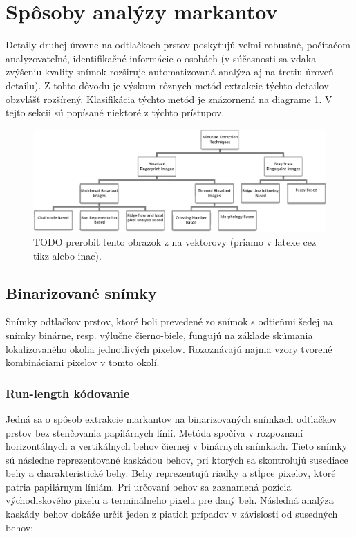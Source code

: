   \section{Spôsoby analýzy markantov} \label{sec:analyza_markantov}
  Detaily druhej úrovne na odtlačkoch prstov poskytujú veľmi robustné, počítačom analyzovateľné, identifikačné informácie o osobách (v súčasnosti sa vďaka
  zvýšeniu kvality snímok rozširuje automatizovaná analýza aj na tretiu úroveň detailu). Z tohto dôvodu je výskum rôznych metód extrakcie týchto detailov
  obzvlášť rozšírený. Klasifikácia týchto metód je znázornená na diagrame \ref{obr:diagram_extrakcia_markantov}. V tejto sekcii sú popísané niektoré
  z týchto prístupov.

  \begin{figure}[h]
    \centering
    \includegraphics[width=\linewidth]{obrazky-figures/klasifikacia_extrakcie_markantov.png}
    \caption{TODO prerobit tento obrazok z \cite{bansal2011minutiae} na vektorovy (priamo v latexe cez tikz alebo inac).}
    \label{obr:diagram_extrakcia_markantov}
  \end{figure}

  \subsection{Binarizované snímky}
  Snímky odtlačkov prstov, ktoré boli prevedené zo snímok s odtieňmi šedej na snímky binárne, resp. výlučne čierno-biele, fungujú na základe skúmania
  lokalizovaného okolia jednotlivých pixelov. Rozoznávajú najmä vzory tvorené kombináciami pixelov v tomto okolí.

  \subsubsection{Run-length kódovanie}
  Jedná sa o spôsob extrakcie markantov na binarizovaných snímkach odtlačkov prstov bez stenčovania papilárnych línií.
  Metóda spočíva v rozpoznaní horizontálnych a vertikálnych behov čiernej v binárnych snímkach. Tieto snímky sú následne reprezentované kaskádou behov,
  pri ktorých sa skontrolujú susediace behy a charakteristické behy. Behy reprezentujú riadky a stĺpce pixelov, ktoré patria papilárnym líniám. Pri určovaní
  behov sa zaznamená pozícia východiskového pixelu a terminálneho pixelu pre daný beh. Následná analýza kaskády behov dokáže určiť jeden z piatich
  prípadov v závislosti od susedných behov:

